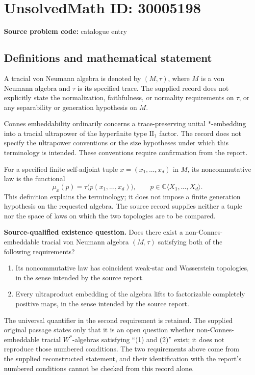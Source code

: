 \documentclass[11pt]{article}
\newcommand{\C}{\mathbb{C}}
\begin{document}
\section*{UnsolvedMath ID: 30005198}
\textbf{Source problem code:} catalogue entry
\subsection{Definitions and mathematical statement}
A tracial von Neumann algebra is denoted by \((M,\tau)\), where \(M\) is a von Neumann algebra and \(\tau\) is its specified trace. The supplied record does not explicitly state the normalization, faithfulness, or normality requirements on \(\tau\), or any separability or generation hypothesis on \(M\).

Connes embeddability ordinarily concerns a trace-preserving unital \(*\)-embedding into a tracial ultrapower of the hyperfinite type \(\mathrm{II}_1\) factor. The record does not specify the ultrapower conventions or the size hypotheses under which this terminology is intended. These conventions require confirmation from the report.

For a specified finite self-adjoint tuple \(x=(x_1,\ldots,x_d)\) in \(M\), its noncommutative law is the functional
\[
\mu_x(p)=\tau\bigl(p(x_1,\ldots,x_d)\bigr),\qquad p\in\C\langle X_1,\ldots,X_d\rangle.
\]
This definition explains the terminology; it does not impose a finite generation hypothesis on the requested algebra. The source record supplies neither a tuple nor the space of laws on which the two topologies are to be compared.

\textbf{Source-qualified existence question.} Does there exist a non-Connes-embeddable tracial von Neumann algebra \((M,\tau)\) satisfying both of the following requirements?
\begin{enumerate}
\item Its noncommutative law has coincident weak-star and Wasserstein topologies, in the sense intended by the source report.
\item Every ultraproduct embedding of the algebra lifts to factorizable completely positive maps, in the sense intended by the source report.
\end{enumerate}
The universal quantifier in the second requirement is retained. The supplied original passage states only that it is an open question whether non-Connes-embeddable tracial \(W^*\)-algebras satisfying ``(1) and (2)'' exist; it does not reproduce those numbered conditions. The two requirements above come from the supplied reconstructed statement, and their identification with the report's numbered conditions cannot be checked from this record alone.
\end{document}
